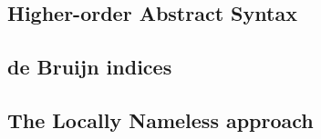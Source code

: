 \documentclass[]{unswthesis}
\begin{document}
\subsection{Higher-order Abstract Syntax}

\subsection{de Bruijn indices}

\subsection{The Locally Nameless approach}



%
%
%
%
%

\backmatter



%
%
\end{document}
